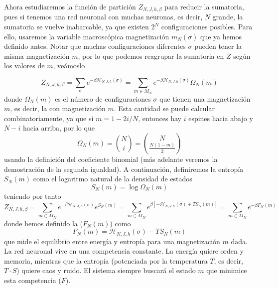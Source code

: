 \noindent
Ahora estudiaremos la función de partición $Z_{N,J,h,\beta}$ para reducir la sumatoria, pues si tenemos una red neuronal con muchas neuronas, es decir, $N$ grande, la sumatoria se vuelve inabarcable, ya que existen $2^N$ configuraciones posibles. Para ello, usaremos la variable macroscópica magnetización $m_N(\sigma)$ que ya hemos definido antes. Notar que muchas configuraciones diferentes $\sigma$ pueden tener la misma magnetización $m$, por lo que podemos reagrupar la sumatoria en $Z$ según los valores de $m$, veámoslo

\begin{equation*}
    Z_{N,J,h,\beta} = \sum_{\sigma} e^{-\beta \mathcal{H}_{N,J,h}(\sigma)} = \sum_{m \in M_N}  e^{-\beta \mathcal{H}_{N,J,h}(\sigma)} \Omega_N(m)
\end{equation*}
donde $\Omega_N(m)$ es el número de configuraciones $\sigma$ que tienen una magnetización $m$, es decir, la  con magnetización $m$. Esta cantidad se puede calcular combinatoriamente, ya que si $m = 1 - 2i/N$, entonces hay $i$ espines hacia abajo y $N-i$ hacia arriba, por lo que
\begin{equation*}
    \Omega_N(m) = \binom{N}{i} = \binom{N}{\frac{N(1-m)}{2}}
\end{equation*}
usando la definición del coeficiente binomial (más adelante veremos la demostración de la segunda igualdad). A continuación, definiremos la entropía $S_N(m)$ como el logaritmo natural de la densidad de estados
\begin{equation*}
    S_N(m) = \log \Omega_N(m)
\end{equation*}
teniendo por tanto 
\begin{equation*}
    Z_{N,J,h,\beta} = \sum_{m \in M_N}  e^{-\beta \mathcal{H}_{N,J,h}(\sigma)} e^{S_N(m)}= \sum_{m \in M_N}  e^{\beta \left[ -\mathcal{H}_{N,J,h}(\sigma) + TS_N(m) \right]}= \sum_{m \in M_N}  e^{-\beta F_N(m)}
\end{equation*}
donde hemos definido la  ($F_N(m)$) como
\begin{equation*}
    F_N(m) = \mathcal{H}_{N,J,h}(\sigma) - TS_N(m)
\end{equation*}
que mide el equilibrio entre energía y entropía para una magnetización $m$ dada. La red neuronal vive en una competencia constante. La energía quiere orden y memoria, mientras que la entropía (potenciada por la temperatura $T$, es decir, $T\cdot S$) quiere caos y ruido. El sistema siempre buscará el estado $m$ que minimice esta competencia ($F$). \\

